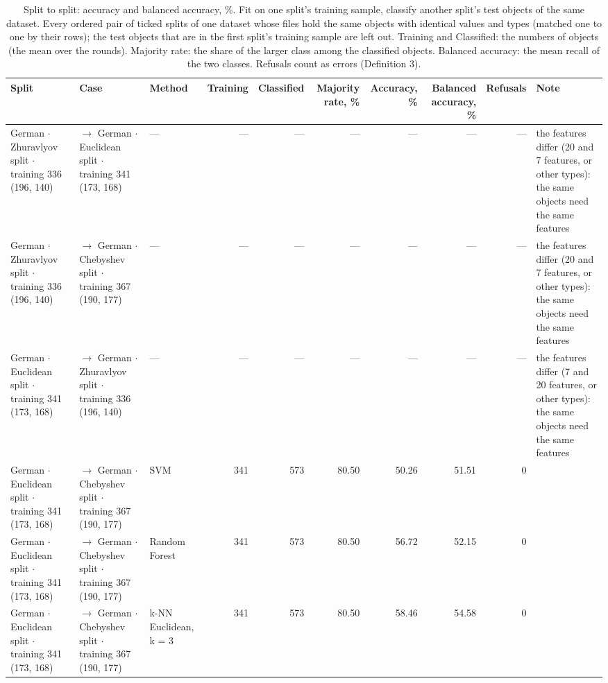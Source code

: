 \begin{table}[htbp]
  \centering
  \caption{Split to split: accuracy and balanced accuracy, \%. Fit on one split's training sample, classify another split's test objects of the same dataset. Every ordered pair of ticked splits of one dataset whose files hold the same objects with identical values and types (matched one to one by their rows); the test objects that are in the first split's training sample are left out. Training and Classified: the numbers of objects (the mean over the rounds). Majority rate: the share of the larger class among the classified objects. Balanced accuracy: the mean recall of the two classes. Refusals count as errors (Definition 3).}
  \label{tab:cross-split}
  \begin{tabular}{lllrrrrrrl}
    \toprule
    Split & Case & Method & Training & Classified & Majority rate, \% & Accuracy, \% & Balanced accuracy, \% & Refusals & Note \\
    \midrule
    German $\cdot$ Zhuravlyov split $\cdot$ training 336 (196, 140) & $\to$ German $\cdot$ Euclidean split $\cdot$ training 341 (173, 168) & --- & --- & --- & --- & --- & --- & --- & the features differ (20 and 7 features, or other types): the same objects need the same features \\
    German $\cdot$ Zhuravlyov split $\cdot$ training 336 (196, 140) & $\to$ German $\cdot$ Chebyshev split $\cdot$ training 367 (190, 177) & --- & --- & --- & --- & --- & --- & --- & the features differ (20 and 7 features, or other types): the same objects need the same features \\
    German $\cdot$ Euclidean split $\cdot$ training 341 (173, 168) & $\to$ German $\cdot$ Zhuravlyov split $\cdot$ training 336 (196, 140) & --- & --- & --- & --- & --- & --- & --- & the features differ (7 and 20 features, or other types): the same objects need the same features \\
    German $\cdot$ Euclidean split $\cdot$ training 341 (173, 168) & $\to$ German $\cdot$ Chebyshev split $\cdot$ training 367 (190, 177) & SVM & 341 & 573 & 80.50 & 50.26 & 51.51 & 0 &  \\
    German $\cdot$ Euclidean split $\cdot$ training 341 (173, 168) & $\to$ German $\cdot$ Chebyshev split $\cdot$ training 367 (190, 177) & Random Forest & 341 & 573 & 80.50 & 56.72 & 52.15 & 0 &  \\
    German $\cdot$ Euclidean split $\cdot$ training 341 (173, 168) & $\to$ German $\cdot$ Chebyshev split $\cdot$ training 367 (190, 177) & k-NN Euclidean, k = 3 & 341 & 573 & 80.50 & 58.46 & 54.58 & 0 &  \\

\end{tabular}
\end{table}
